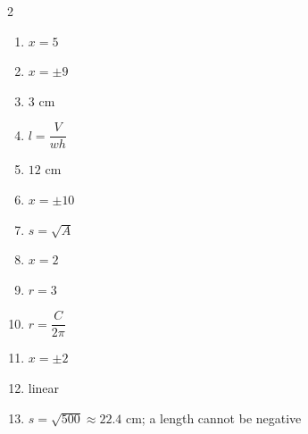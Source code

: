 \documentclass[11pt]{article}
\begin{document}
\begin{keybox}
\begin{multicols}{2}
\small
\begin{enumerate}[leftmargin=*,itemsep=3pt]
  \item $x=5$
  \item $x=\pm9$
  \item $3$ cm
  \item $l=\dfrac{V}{wh}$
  \item $12$ cm
  \item $x=\pm10$
  \item $s=\sqrt{A}$
  \item $x=2$
  \item $r=3$
  \item $r=\dfrac{C}{2\pi}$
  \item $x=\pm2$
  \item linear
  \item $s=\sqrt{500}\approx22.4$ cm; a length cannot be negative
\end{enumerate}
\end{multicols}
\end{keybox}
\end{document}
